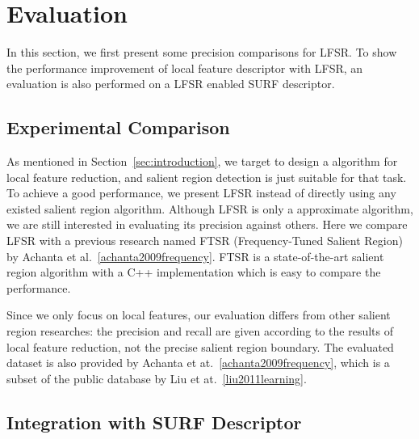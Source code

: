 \section{Evaluation}
\label{sec:evaluation}

In this section, we first present some precision comparisons for LFSR. To show the performance improvement of local feature descriptor with LFSR, an evaluation is also performed on a LFSR enabled SURF descriptor.

\subsection{Experimental Comparison}
\label{sec:evaluation_comparison}

As mentioned in Section~\ref{sec:introduction}, we target to design a algorithm for local feature reduction, and salient region detection is just suitable for that task. To achieve a good performance, we present LFSR instead of directly using any existed salient region algorithm. Although LFSR is only a approximate algorithm, we are still interested in evaluating its precision against others. Here we compare LFSR with a previous research named FTSR (Frequency-Tuned Salient Region) by Achanta et al.~\ref{achanta2009frequency}. FTSR is a state-of-the-art salient region algorithm with a C++ implementation which is easy to compare the performance.

Since we only focus on local features, our evaluation differs from other salient region researches: the precision and recall are given according to the results of local feature reduction, not the precise salient region boundary. The evaluated dataset is also provided by Achanta et at.~\ref{achanta2009frequency}, which is a subset of the public database by Liu et at.~\ref{liu2011learning}.

\subsection{Integration with SURF Descriptor}
\label{sec:observaion_integration}
